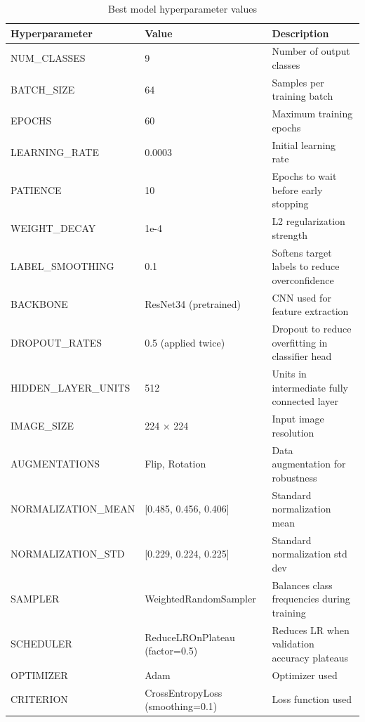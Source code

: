 \documentclass{article} %
\begin{document}
\begin{table}[h]
\caption{Best model hyperparameter values}
\label{hyperparameters}
\begin{center}
\footnotesize
\begin{tabularx}{\textwidth}{lXl}
\toprule
\textbf{Hyperparameter} & \textbf{Value} & \textbf{Description} \\
\midrule
NUM\_CLASSES & 9 & Number of output classes \\
BATCH\_SIZE & 64 & Samples per training batch \\
EPOCHS & 60 & Maximum training epochs \\
LEARNING\_RATE & 0.0003 & Initial learning rate \\
PATIENCE & 10 & Epochs to wait before early stopping \\
WEIGHT\_DECAY & 1e-4 & L2 regularization strength \\
LABEL\_SMOOTHING & 0.1 & Softens target labels to reduce overconfidence \\
BACKBONE & ResNet34 (pretrained) & CNN used for feature extraction \\
DROPOUT\_RATES & 0.5 (applied twice) & Dropout to reduce overfitting in classifier head \\
HIDDEN\_LAYER\_UNITS & 512 & Units in intermediate fully connected layer \\
IMAGE\_SIZE & 224 × 224 & Input image resolution \\
AUGMENTATIONS & Flip, Rotation & Data augmentation for robustness \\
NORMALIZATION\_MEAN & [0.485, 0.456, 0.406] & Standard normalization mean \\
NORMALIZATION\_STD & [0.229, 0.224, 0.225] & Standard normalization std dev \\
SAMPLER & WeightedRandomSampler & Balances class frequencies during training \\
SCHEDULER & ReduceLROnPlateau (factor=0.5) & Reduces LR when validation accuracy plateaus \\
OPTIMIZER & Adam & Optimizer used \\
CRITERION & CrossEntropyLoss (smoothing=0.1) & Loss function used \\
\bottomrule
\end{tabularx}
\end{center}
\end{table}
\end{document}
